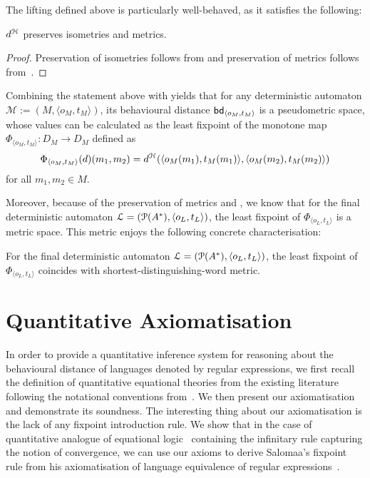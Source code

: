 The lifting defined above is particularly well-behaved, as it satisfies the following:

\begin{proposition}
	$d^{\mathcal{H}}$ preserves isometries and metrics.
\end{proposition}
\begin{proof}
	Preservation of isometries follows from \cite[Theorem 5.23]{Baldan:2018:Coalgebraic} and preservation of metrics follows from~\cite[Theorem~5.24]{Baldan:2018:Coalgebraic}.
\end{proof}
Combining the statement above with  yields that for any deterministic automaton $\mathcal{M} := (M, \langle o_M, t_M \rangle)$, its behavioural distance $\mathsf{bd}_{\langle o_M, t_M \rangle}$ is a pseudometric space, whose values can be calculated as the least fixpoint of the monotone map $\Phi_{\langle o_M, t_M\rangle} \colon D_M \to D_M$ defined as
$$
\Phi_{\langle o_M, t_M\rangle}(d)(m_1, m_2) = d^{\mathcal{H}}(\langle o_M(m_1), t_{M}(m_1) \rangle, \langle o_M(m_2), t_{M}(m_2) \rangle)
$$
for all $m_1, m_2 \in M$.

Moreover, because of the preservation of metrics and , we know that for the final deterministic automaton $\mathcal{L} = (\mathcal{P} ({A}^\ast), \langle o_L, t_L\rangle)$, the least fixpoint of $\Phi_{\langle o_L, t_L\rangle}$ is a metric space. This metric enjoys the following concrete characterisation:
\begin{proposition}
	For the final deterministic automaton $\mathcal{L} = (\mathcal{P} ({A}^\ast), \langle o_L, t_L\rangle)$, the least fixpoint of $\Phi_{\langle o_L, t_L\rangle}$ coincides with shortest-distinguishing-word metric.
\end{proposition}

\section{Quantitative Axiomatisation}\label{c2:sec:quantitative_axiomatisation}
In order to provide a quantitative inference system for reasoning about the behavioural distance of languages denoted by regular expressions, we first recall the definition of quantitative equational theories from the existing literature~\cite{Mardare:2016:Quantitative,Bacci:2018:Bisimilarity} following the notational conventions from~\cite{Bacci:2018:Bisimilarity}. We then present our axiomatisation and demonstrate its soundness. The interesting thing about our axiomatisation is the lack of any fixpoint introduction rule. We show that in the case of quantitative analogue of equational logic~\cite{Mardare:2016:Quantitative} containing the infinitary rule capturing the notion of convergence, we can use our axioms to derive Salomaa's fixpoint rule from his axiomatisation of language equivalence of regular expressions~\cite{Salomaa:1966:Two}.

